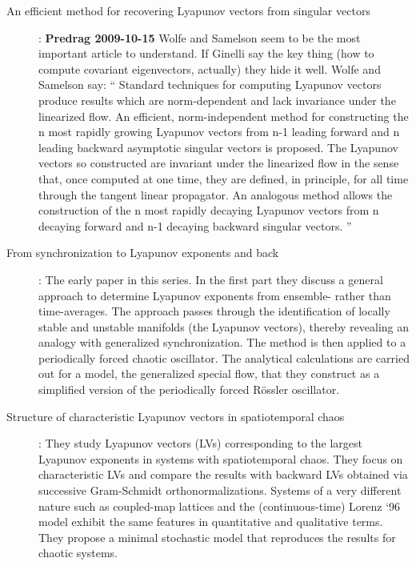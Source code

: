 \begin{description}
\item[An efficient method for recovering Lyapunov vectors from
singular vectors]:
{\bf Predrag 2009-10-15} Wolfe and Samelson seem to be the most important article
to understand. If Ginelli \etal{} say the key thing
(how to compute covariant eigenvectors, actually) they hide it well.
Wolfe and Samelson say: ``
  Standard techniques for computing Lyapunov vectors produce
  results which are norm-dependent and lack invariance under
  the linearized flow. An efficient, norm-independent method
  for constructing the n most rapidly growing Lyapunov
  vectors from n-1 leading forward and n leading backward
  asymptotic singular vectors is proposed. The Lyapunov
  vectors so constructed are invariant under the linearized
  flow in the sense that, once computed at one time, they are
  defined, in principle, for all time through the tangent
  linear propagator. An analogous method allows the
  construction of the n most rapidly decaying Lyapunov
  vectors from n decaying forward and n-1 decaying backward
  singular vectors.
  ''

\item[From synchronization to Lyapunov exponents and
              back]:
The early paper in this series.
In the first part they discuss a general approach to determine
Lyapunov exponents from ensemble- rather than time-averages.
The approach passes through the identification of locally
stable and unstable manifolds (the Lyapunov vectors), thereby
revealing an analogy with generalized synchronization. The
method is then applied to a periodically forced chaotic
oscillator. The
analytical calculations are carried out for a model, the
generalized special flow, that they construct as a simplified
version of the periodically forced R\"ossler oscillator.

\item[Structure of characteristic {L}yapunov vectors in
      spatiotemporal chaos]:
They study Lyapunov vectors (LVs) corresponding to
the largest Lyapunov exponents in systems with spatiotemporal
chaos. They focus on characteristic LVs and compare the results
with backward LVs obtained via successive Gram-Schmidt
orthonormalizations. Systems of a very different nature such
as coupled-map lattices and the (continuous-time) Lorenz `96
model exhibit the same features in quantitative and
qualitative terms. They propose a minimal
stochastic model that reproduces the results for chaotic
systems.


\end{description}
